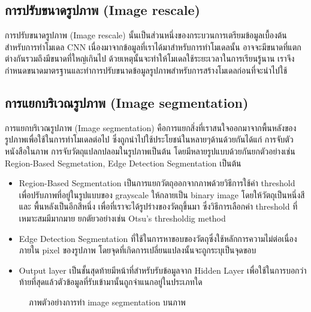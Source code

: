 \documentclass[12pt,oneside,openright,a4paper]{cpe-thai-project}
\begin{document}
\subsection{การปรับขนาดรูปภาพ (Image rescale)}
การปรับขนาดรูปภาพ (Image rescale) นั้นเป็นส่วนหนึ่งของกระบวนการเตรียมข้อมูลเบื้องต้นสำหรับการทำโมเดล CNN 
เนื่องมาจากข้อมูลที่เราได้มาสำหรับการทำโมเดลนั้น อาจจะมีขนาดที่แตกต่างกันรวมถึงมีขนาดที่ใหญ่เกินไป ด้วยเหตุนั้นจะทำให้โมเดลใช้ระยะเวลาในการเรียนรู้นาน 
เราจึงกำหนดขนาดมาตรฐานและทำการปรับขนาดข้อมูลรูปภาพสำหรับการสร้างโมเดลก่อนที่จะนำไปใช้

\subsection{การแยกบริเวณรูปภาพ (Image segmentation)}
การแยกบริเวณรูปภาพ (Image segmentation) คือการแยกสิ่งที่เราสนใจออกมาจากพื้นหลังของรูปภาพเพื่อใช้ในการทำโมเดลต่อไป ซึ่งถูกนำไปใช้ประโยชน์ในหลายๆด้านด้วยกันได้แก่ 
การจับตัวหนังสือในภาพ การจับวัตถุแปลกปลอมในรูปภาพเป็นต้น โดยมีหลายรูปแบบด้วยกันยกตัวอย่างเช่น Region-Based Segmetation, Edge Detection Segmentation เป็นต้น
\begin{itemize}
  \item Region-Based Segmentation เป็นการแยกวัตถุออกจากภาพด้วยวิธีการใช้ค่า threshold เพื่อปรับภาพที่อยู่ในรูปแบบของ grayscale ให้กลายเป็น binary image โดยให้วัตถุเป็นหนึ่งสี และ พื้นหลังเป็นอีกสีหนึ่ง เพื่อที่เราจะได้รูปร่างของวัตถุขึ้นมา ซึ่งวิธีการเลือกค่า threshold ที่เหมาะสมมีมากมาย ยกตัยวอย่างเช่น Otsu’s thresholdig method

  \item Edge Detection Segmentation ที่ใช้ในการหาขอบของวัตถุซึ่งใช้หลักการความไม่ต่อเนื่องภายใน pixel ของรูปภาพ โดยจุดที่เกิดการเปลี่ยนแปลงนั้นจะถูกระบุเป็นจุดขอบ 
  \item Output layer เป็นชั้นสุดท้ายมีหน้าที่สำหรับรับข้อมูลจาก Hidden Layer เพื่อใช้ในการบอกว่าท้ายที่สุดแล้วตัวข้อมูลที่รับเข้ามานั้นถูกจำแนกอยู่ในประเภทใด
\end{itemize}
\begin{figure}[!ht]\centering
  \setlength{\fboxrule}{0.2mm} %
  \setlength{\fboxsep}{1cm}
  \caption{ภาพตัวอย่างการทำ image segmentation บนภาพ}\label{fig:imagesegment}
\end{figure}
\end{document}
